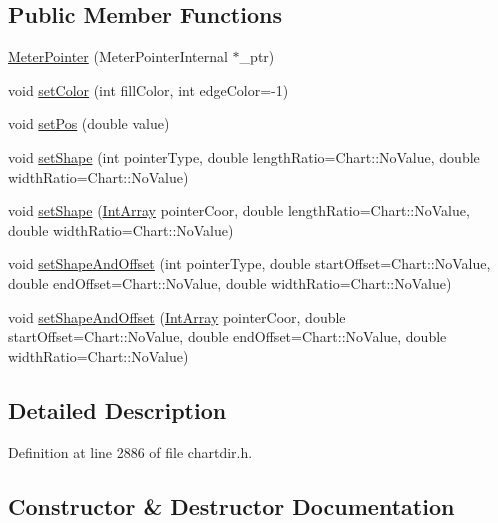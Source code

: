 \subsection*{Public Member Functions}
\begin{DoxyCompactItemize}
\item 
\hyperlink{class_meter_pointer_a8a559eeef7aa9de0d3b253e0d951c594}{Meter\+Pointer} (Meter\+Pointer\+Internal $\ast$\+\_\+ptr)
\item 
void \hyperlink{class_meter_pointer_ae53620b550381d721b3319fa9d41178c}{set\+Color} (int fill\+Color, int edge\+Color=-\/1)
\item 
void \hyperlink{class_meter_pointer_ac76bcf974ea61a13867aef4e83c02a48}{set\+Pos} (double value)
\item 
void \hyperlink{class_meter_pointer_a597012c2677c3f1f05501ae8ce7ea743}{set\+Shape} (int pointer\+Type, double length\+Ratio=Chart\+::\+No\+Value, double width\+Ratio=Chart\+::\+No\+Value)
\item 
void \hyperlink{class_meter_pointer_a3dd157f4c0eb3c42567d90fa38ab1d0a}{set\+Shape} (\hyperlink{class_int_array}{Int\+Array} pointer\+Coor, double length\+Ratio=Chart\+::\+No\+Value, double width\+Ratio=Chart\+::\+No\+Value)
\item 
void \hyperlink{class_meter_pointer_abfea6d66197a40b67d984137034bb393}{set\+Shape\+And\+Offset} (int pointer\+Type, double start\+Offset=Chart\+::\+No\+Value, double end\+Offset=Chart\+::\+No\+Value, double width\+Ratio=Chart\+::\+No\+Value)
\item 
void \hyperlink{class_meter_pointer_a1fe290c1ac81816a5a1d06673fb414d5}{set\+Shape\+And\+Offset} (\hyperlink{class_int_array}{Int\+Array} pointer\+Coor, double start\+Offset=Chart\+::\+No\+Value, double end\+Offset=Chart\+::\+No\+Value, double width\+Ratio=Chart\+::\+No\+Value)
\end{DoxyCompactItemize}


\subsection{Detailed Description}


Definition at line 2886 of file chartdir.\+h.



\subsection{Constructor \& Destructor Documentation}
\mbox{\label{class_meter_pointer_a8a559eeef7aa9de0d3b253e0d951c594}} 
